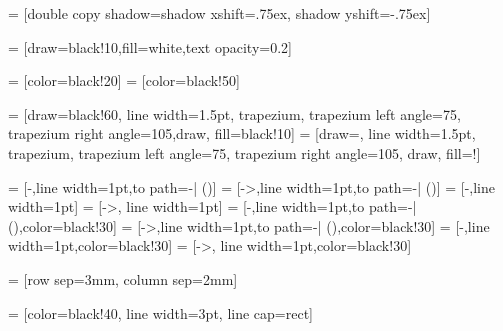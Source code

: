  = [double copy shadow={shadow xshift=.75ex, shadow yshift=-.75ex}]

 = [draw=black!10,fill=white,text opacity=0.2]

 = [color=black!20]
 = [color=black!50]

\newcommand{\dataRightAngle}{105}
\newcommand{\dataLeftAngle}{75}


 = [draw=black!60, line width=1.5pt, trapezium, trapezium left angle=\dataLeftAngle, trapezium right angle=\dataRightAngle,draw, fill=black!10]
 = [draw=\dataColor, line width=1.5pt, trapezium, trapezium left angle=\dataLeftAngle, trapezium right angle=\dataRightAngle, draw, fill=\dataColor!\fillOpacity]

 = [-,line width=1pt,to path={-| (\tikztotarget)}]
 = [->,line width=1pt,to path={-| (\tikztotarget)}]
 = [-,line width=1pt]
 = [->, line width=1pt]
 = [-,line width=1pt,to path={-| (\tikztotarget)},color=black!30]
 = [->,line width=1pt,to path={-| (\tikztotarget)},color=black!30]
 = [-,line width=1pt,color=black!30]
 = [->, line width=1pt,color=black!30]

 = [row sep=3mm, column sep=2mm]

 = [color=black!40, line width=3pt, line cap=rect]


